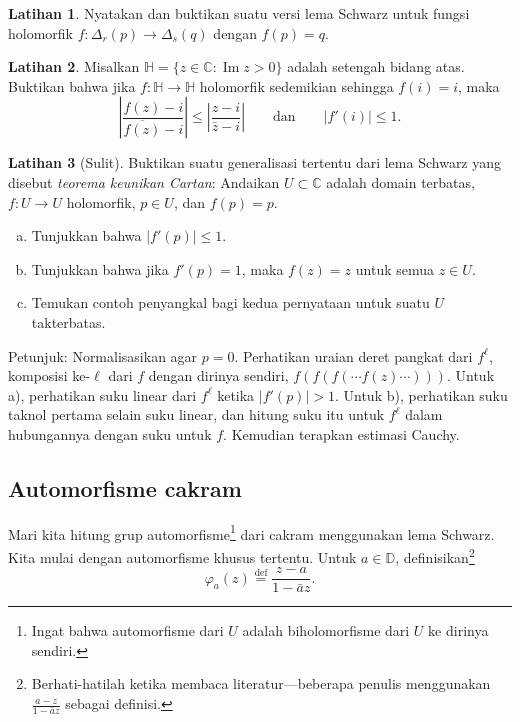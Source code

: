 \documentclass[12pt,openany]{book}
\renewcommand{\Im}{\operatorname{Im}}
\newcommand{\abs}[1]{\left\lvert {#1} \right\rvert}
\newcommand{\C}{{\mathbb{C}}}
\newcommand{\D}{{\mathbb{D}}}
\newcommand{\bH}{{\mathbb{H}}}
\newcommand{\myindex}[1]{#1\index{#1}}
\theoremstyle{plain}
\theoremstyle{remark}
\theoremstyle{definition}
\newenvironment{exbox}{%
    \def\FrameCommand{\vrule width 1pt \relax\hspace{10pt}}%
    \MakeFramed{\advance\hsize-\width\FrameRestore}%
}{%
    \endMakeFramed
}
\newenvironment{exparts}{%
    \leavevmode\begin{enumerate}[a),noitemsep,topsep=0pt,parsep=0pt,partopsep=0pt]
}{%
    \end{enumerate}
}
\theoremstyle{exercise}
\newtheorem{exercise}{Latihan}[section]
\theoremstyle{example}
\begin{document}
\begin{exbox}
\begin{exercise}
Nyatakan dan buktikan suatu versi lema Schwarz untuk fungsi holomorfik
$f \colon \Delta_r(p) \to \Delta_s(q)$ dengan $f(p)=q$.
\end{exercise}

\begin{exercise}
Misalkan $\bH = \{ z \in \C : \Im z > 0 \}$ adalah setengah bidang atas.
Buktikan bahwa jika $f \colon \bH \to \bH$ holomorfik sedemikian sehingga $f(i) = i$, maka
\begin{equation*}
\abs{\frac{f(z)-i}{\overline{f(z)}-i}} \leq
\abs{\frac{z-i}{\bar{z}-i}} 
\qquad
\text{dan}
\qquad
\abs{f'(i)} \leq 1 .
\end{equation*}
\end{exercise}

\begin{exercise}[Sulit]
Buktikan suatu generalisasi tertentu dari lema Schwarz
yang disebut \emph{\myindex{teorema keunikan Cartan}}:
Andaikan $U \subset \C$
adalah domain terbatas,
$f \colon U \to U$ holomorfik,
$p \in U$,
dan $f(p)=p$.
\begin{exparts}
\item
Tunjukkan bahwa $\abs{f'(p)} \leq 1$.
\item
Tunjukkan bahwa jika $f'(p) = 1$, maka $f(z) = z$ untuk semua $z \in U$.
\item
Temukan contoh penyangkal bagi kedua pernyataan untuk suatu $U$ takterbatas.
\end{exparts}
Petunjuk: Normalisasikan agar $p=0$.  Perhatikan uraian deret pangkat dari
$f^{\ell}$, komposisi ke-$\ell$ dari $f$ dengan dirinya sendiri,
$f(f(f(\cdots f(z) \cdots)))$.
Untuk a), perhatikan suku linear dari $f^{\ell}$ ketika $\abs{f'(p)}
> 1$.  Untuk b), perhatikan suku taknol pertama selain
suku linear, dan hitung suku itu untuk $f^{\ell}$ dalam hubungannya
dengan suku untuk $f$.  Kemudian terapkan estimasi Cauchy.
\end{exercise}
\end{exbox}

\subsection{Automorfisme cakram}

Mari kita hitung grup automorfisme\footnote{Ingat bahwa automorfisme dari $U$ adalah
biholomorfisme dari $U$ ke dirinya sendiri.}
dari cakram menggunakan lema Schwarz.
Kita mulai dengan automorfisme khusus tertentu.
Untuk $a \in \D$, definisikan\footnote{%
Berhati-hatilah ketika membaca literatur---beberapa penulis menggunakan $\frac{a-z}{1-\bar{a}z}$ sebagai definisi.}
%
\begin{equation*}
\varphi_a(z) \overset{\text{def}}{=} \frac{z-a}{1-\bar{a}z}.
\end{equation*}
\end{document}
